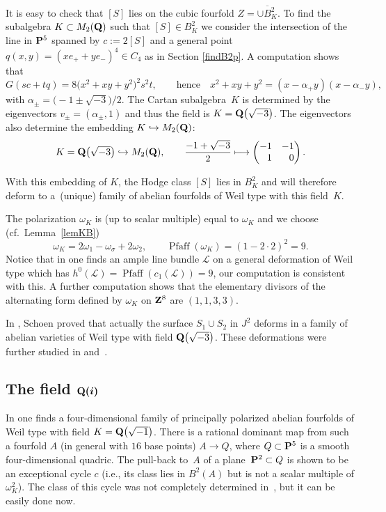 \documentclass[10pt,a4paper]{amsart}
\numberwithin{equation}{section}
\begin{document}
It is easy to check that $[S]$ lies on the cubic fourfold $Z=\overline{\cup B^2_K}$.
To find the subalgebra $K\subset M_2({\bf Q})$ such that $[S]\in B^2_K$
we consider the intersection of the line in ${\bf P}^5$
spanned by $c:=2[S]$ and a general point $q(x,y)=(xe_++ye_-)^4 \in C_4$ as in Section \ref{findB2p}.
A computation shows that
\[
G(sc+tq)=8\big(x^2+xy+y^2\big)^2s^2t,\qquad\text{hence}\quad
x^2+xy+y^2 = (x-\alpha_+y)(x-\alpha_-y),
\]
with $\alpha_\pm=\big({-}1\pm\sqrt{-3}\big)/2$. The Cartan subalgebra~$K$ is
determined by the eigenvectors $v_{\pm}=(\alpha_\pm,1)$ and thus the
field is $K={\bf Q}\big(\sqrt{-3}\big)$. The eigenvectors also determine the embedding
$K\hookrightarrow M_2({\bf Q})$:
\[
K = {\bf Q}\big(\sqrt{-3}\big) \hookrightarrow M_2({\bf Q}),\qquad
\frac{-1+\sqrt{-3}}{2} \longmapsto \left(\begin{matrix}-1&-1\\ \hphantom{-}1&\hphantom{-}0\end{matrix}\right).
\]

With this embedding of $K$, the Hodge class $[S]$ lies in $B^2_K$ and
will therefore deform to a~(unique) family of abelian fourfolds of
Weil type with this field~$K$.

The polarization $\omega_K$ is (up to scalar multiple)
equal to $\omega_K$ and we choose (cf.\ Lemma~\ref{lemKB})
\[
\omega_K = 2\omega_1 - \omega_\sigma + 2\omega_2,
\qquad\operatorname{Pfaff}(\omega_K) = (1-2\cdot 2)^2 = 9.
\]
Notice that in \cite[proof of Lemma~10.4]{schoen} one finds an ample line bundle
${\mathcal L}$ on a general deformation of Weil type which has
$h^0({\mathcal L})=\operatorname{Pfaff}(c_1({\mathcal L}))=9$,
our computation is consistent with this.
A further computation shows that the elementary divisors of the alternating form
defined by $\omega_K$ on ${\bf Z}^8$ are $(1,1,3,3)$.

In \cite{schoen}, Schoen proved that actually the surface $S_1\cup S_2$ in $J^2$ deforms
in a family of abelian varieties of Weil type with field ${\bf Q}\big(\sqrt{-3}\big)$. These deformations
were further studied in \cite{CMLR} and~\cite{RRS}.

\subsection[The field Q(i)]{The field $\boldsymbol{{\bf Q}(i)}$}\label{qi}
In \cite{vG} one finds a four-dimensional family of principally polarized
abelian fourfolds of Weil type with field $K={\bf Q}\big(\sqrt{-1}\big)$.
There is a rational dominant map from such a fourfold $A$
(in general with $16$ base points) $A\rightarrow Q$,
where $Q\subset {\bf P}^5$ is a smooth four-dimensional quadric.
The pull-back to~$A$ of a plane~${\bf P}^2\subset Q$ is shown to be an exceptional cycle $c$
(i.e., its class lies in $B^2(A)$ but is not a scalar multiple of $\omega_K^2$). The class of
this cycle was not completely determined in~\cite{vG}, but it can be easily done now.
\end{document}
